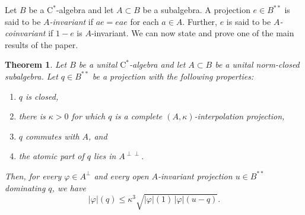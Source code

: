 \documentclass[10pt]{amsart}
\newcommand{\rC}{\mathrm{C}}
\renewcommand{\phi}{\varphi}
\newtheorem{theorem}[lemma]{Theorem}
\theoremstyle{definition}
\begin{document}
Let $B$ be a $\rC^*$-algebra and let $A\subset B$ be a subalgebra. A projection $e\in B^{**}$ is said to be \emph{$A$-invariant} if $ae=eae$ for each $a\in A$. Further, $e$ is said to be \emph{$A$-coinvariant} if $1-e$ is $A$-invariant. We can now state and prove one of the main results of the paper.



 \begin{theorem}\label{T:ncVar}
 Let $B$ be a unital $\rC^*$-algebra and let $A\subset B$ be a unital norm-closed subalgebra.  Let $q\in B^{**}$ be a projection with the following properties:
 \begin{enumerate}[{\rm(i)}]
 \item $q$ is closed,
 \item there is $\kappa>0$ for which $q$ is a complete $(A,\kappa)$-interpolation projection,
 \item $q$ commutes with $A$, and
 \item the atomic part of $q$ lies in $A^{\perp\perp}$.
\end{enumerate}
Then, for every $\phi\in A^\perp$  and every open $A$-invariant projection $u\in B^{**}$ dominating $q$, we have
\[
 |\phi|(q)\leq  \kappa^3 \sqrt{|\phi|(1)\, | \phi|(u-q)}.
\]
 \end{theorem}
\end{document}
